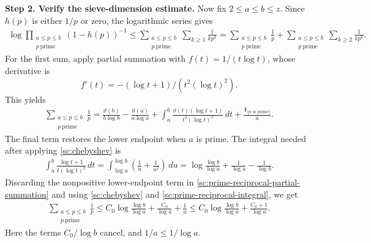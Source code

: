 \documentclass[twoside]{aomart}
\makeatletter
\theoremstyle{paperplain}
\theoremstyle{paperdefinition}
\renewenvironment{proof}[1][\proofname]{\par\pushQED{\qed}%
  \normalfont\topsep6\p@\@plus3\p@\relax\trivlist
  \item[\hskip\labelsep\itshape #1\@addpunct{.}]\ignorespaces
}{\popQED\endtrivlist\@endpefalse}
\numberwithin{equation}{section}
\makeatother
\begin{document}
\begin{proof}
\par
\medskip
\noindent\textbf{Step 2. Verify the sieve-dimension estimate.}
Now fix $2\le a\le b\le z$. Since $h(p)$ is either $1/p$ or zero,
the logarithmic series gives
\begin{equation}
 \begin{aligned}
 \log\prod_{\substack{a\le p\le b\\p\ \mathrm{prime}}}(1-h(p))^{-1}
 \le\sum_{\substack{a\le p\le b\\p\ \mathrm{prime}}}\sum_{k\ge1}\frac1{kp^k}
 =\sum_{\substack{a\le p\le b\\p\ \mathrm{prime}}}\frac1p
   +\sum_{\substack{a\le p\le b\\p\ \mathrm{prime}}}\sum_{k\ge2}\frac1{kp^k}.
 \end{aligned}
 \label{sc:prime-dimension-decomposition}
\end{equation}
For the first sum, apply partial summation with
$f(t)=1/(t\log t)$, whose derivative is
$$f'(t)=-(\log t+1)/(t^2(\log t)^2).$$ This yields
\begin{equation}
 \begin{aligned}
 \sum_{\substack{a\le p\le b\\p\ \mathrm{prime}}}\frac1p
 =\frac{\vartheta(b)}{b\log b}
   -\frac{\vartheta(a)}{a\log a}
+\int_a^b
   \frac{\vartheta(t)(\log t+1)}{t^2(\log t)^2}\,dt
   +\frac{\mathbf1_{\{a\text{ is prime}\}}}{a}.
 \end{aligned}
 \label{sc:prime-reciprocal-partial-summation}
\end{equation}
The final term restores the lower endpoint when $a$ is prime.
The integral needed after applying \eqref{sc:chebyshev} is
\begin{equation}
 \begin{aligned}
 \int_a^b\frac{\log t+1}{t(\log t)^2}\,dt
 =\int_{\log a}^{\log b}\left(\frac1u+\frac1{u^2}\right)\,du
 =\log\frac{\log b}{\log a}
   +\frac1{\log a}-\frac1{\log b}.
 \end{aligned}
 \label{sc:prime-reciprocal-integral}
\end{equation}
Discarding the nonpositive lower-endpoint term in
\eqref{sc:prime-reciprocal-partial-summation} and using
\eqref{sc:chebyshev} and \eqref{sc:prime-reciprocal-integral}, we get
\begin{equation}
 \begin{aligned}
 \sum_{\substack{a\le p\le b\\p\ \mathrm{prime}}}\frac1p
 \le C_0\log\frac{\log b}{\log a}
      +\frac{C_0}{\log a}+\frac1a
 \le C_0\log\frac{\log b}{\log a}
      +\frac{C_0+1}{\log a}.
 \end{aligned}
 \label{sc:bsz-dimension-primes}
\end{equation}
Here the terms $C_0/\log b$ cancel, and $1/a\le1/\log a$.


\end{proof}
\end{document}
